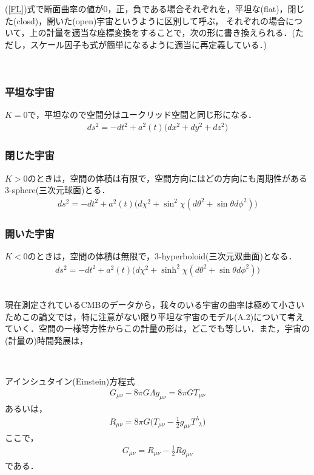 (\ref{FL})式で断面曲率の値が$0$，正，負である場合それぞれを，平坦な(flat)，閉じた(closd)，開いた(open)宇宙というように区別して呼ぶ，
それぞれの場合について，上の計量を適当な座標変換をすることで，次の形に書き換えられる．(ただし，スケール因子も式が簡単になるように適当に再定義している．)
\begin{empheqboxed}
\
\subsubsection{平坦な宇宙}
$K=0$で，平坦なので空間分はユークリッド空間と同じ形になる．
\begin{eqnarray}
\label{flat}
ds^2=-dt^2+a^2(t)\biggl(dx^2+dy^2+dz^2\biggr)
\end{eqnarray}
\subsubsection{閉じた宇宙}
$K>0$のときは，空間の体積は有限で，空間方向にはどの方向にも周期性がある3-sphere(三次元球面)とる．
\begin{eqnarray}
ds^2=-dt^2+a^2(t)\biggl(d\chi^2+\sin^2\chi(d\theta^2+\sin\theta d\phi^2)\biggr)
\end{eqnarray}

\subsubsection{開いた宇宙}
$K<0$のときは，空間の体積は無限で，3-hyperboloid(三次元双曲面)となる．
\begin{eqnarray}
ds^2=-dt^2+a^2(t)\biggl(d\chi^2+\sinh^2\chi(d\theta^2+\sin\theta d\phi^2)\biggr)
\end{eqnarray}
\

\end{empheqboxed}

現在測定されているCMBのデータから，我々のいる宇宙の曲率は極めて小さいためこの論文では，特に注意がない限り平坦な宇宙のモデル(A.2)について考えていく．空間の一様等方性からこの計量の形は，どこでも等しい．また，宇宙の(計量の)時間発展は，
\begin{empheqboxed}
\

アインシュタイン(Einstein)方程式
\begin{eqnarray}
\label{Eeq1}
G_{\mu\nu}-8\pi G\Lambda g_{\mu\nu}=8\pi GT_{\mu\nu}
\end{eqnarray}
あるいは，
\begin{eqnarray}
R_{\mu\nu}=8\pi G\biggl(T_{\mu\nu} -\frac{1}{2}g_{\mu\nu}T^{\lambda}_{\ \ \lambda}\biggr)
\end{eqnarray}
ここで，
\begin{eqnarray}
G_{\mu\nu}=R_{\mu\nu}-\frac{1}{2}Rg_{\mu\nu}
\end{eqnarray}
である．
\end{empheqboxed}


